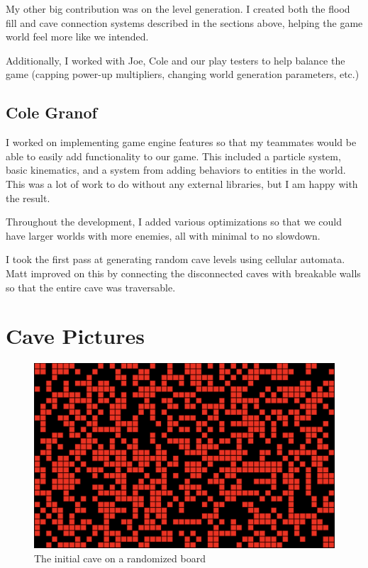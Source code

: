 \documentclass[a4paper, 12pt]{article}
\begin{document}
My other big contribution was on the level generation. I created both the
flood fill and cave connection systems described in the sections above, helping
the game world feel more like we intended.

Additionally, I worked with Joe, Cole and our play testers to help balance the
game (capping power-up multipliers, changing world generation parameters, etc.)

\subsection{Cole Granof}

I worked on implementing game engine features so that my teammates would be able
to easily add functionality to our game. This included a particle system, basic
kinematics, and a system from adding behaviors to entities in the world. This
was a lot of work to do without any external libraries, but I am happy with the
result.

Throughout the development, I added various optimizations so that we could have
larger worlds with more enemies, all with minimal to no slowdown.

I took the first pass at generating random cave levels using cellular automata.
Matt improved on this by connecting the disconnected caves with breakable walls
so that the entire cave was traversable.

\section{Cave Pictures}
\label{sec:cavePictures}

\begin{figure}[h]
	\centering
	\includegraphics[width=\textwidth]{initial-cave.png}
	\caption{The initial cave on a randomized board}
	\label{fig:initialCave}
\end{figure}
\end{document}
